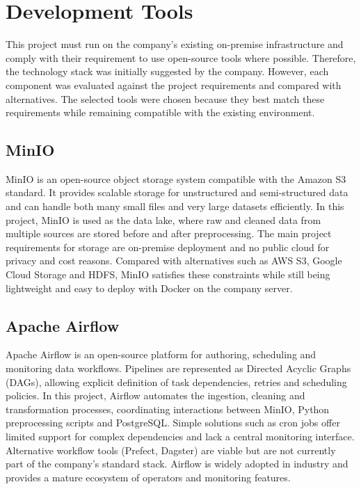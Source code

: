 \documentclass[12pt,oneside,openright,a4paper]{cpe-english-project}
\begin{document}
\section{Development Tools}

This project must run on the company's existing on-premise infrastructure and comply with their requirement to use open-source tools where possible. Therefore, the technology stack was initially suggested by the company. However, each component was evaluated against the project requirements and compared with alternatives. The selected tools were chosen because they best match these requirements while remaining compatible with the existing environment.

\subsection{MinIO}
MinIO is an open-source object storage system compatible with the Amazon S3 standard. It provides scalable storage for unstructured and semi-structured data and can handle both many small files and very large datasets efficiently. In this project, MinIO is used as the data lake, where raw and cleaned data from multiple sources are stored before and after preprocessing. The main project requirements for storage are on-premise deployment and no public cloud for privacy and cost reasons. Compared with alternatives such as AWS S3, Google Cloud Storage and HDFS, MinIO satisfies these constraints while still being lightweight and easy to deploy with Docker on the company server.

\subsection{Apache Airflow}
Apache Airflow is an open-source platform for authoring, scheduling and monitoring data workflows. Pipelines are represented as Directed Acyclic Graphs (DAGs), allowing explicit definition of task dependencies, retries and scheduling policies. In this project, Airflow automates the ingestion, cleaning and transformation processes, coordinating interactions between MinIO, Python preprocessing scripts and PostgreSQL. Simple solutions such as cron jobs offer limited support for complex dependencies and lack a central monitoring interface. Alternative workflow tools (Prefect, Dagster) are viable but are not currently part of the company's standard stack. Airflow is widely adopted in industry and provides a mature ecosystem of operators and monitoring features.
\end{document}
